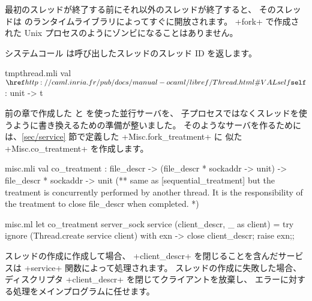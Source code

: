 最初のスレッドが終了する前にそれ以外のスレッドが終了すると、
そのスレッドは \ocaml のランタイムライブラリによってすぐに開放されます。
\ml+fork+ で作成された Unix プロセスのようにゾンビになることはありません。

システムコール  は呼び出したスレッドのスレッド ID を返します。
\begin{listingcodefile}{tmpthread.mli}
val $\libvalue{Thread}{self}$ : unit -> t
\end{listingcodefile}

前の章で作成した  と  を使った並行サーバを、
子プロセスではなくスレッドを使うように書き換えるための準備が整いました。
そのようなサーバを作るためには、\ref{sec/service} 節で定義した \ml+Misc.fork_treatment+ に
似た \ml+Misc.co_treatment+ を作成します。

%
\begin{codefile}{misc.mli}
val co_treatment :
file_descr -> (file_descr * sockaddr -> unit) ->
file_descr * sockaddr -> unit
(** same as [sequential_treatment] but the treatment is concurrently
 performed by another thread. It is the responsibility of the treatment
 to close file_descr when completed. *)
\end{codefile}
%
\begin{listingcodefile}{misc.ml}
let co_treatment server_sock service (client_descr, _ as client) =
  try ignore (Thread.create service client)
  with exn -> close client_descr; raise exn;;
\end{listingcodefile}
%
スレッドの作成に作成して場合、
\ml+client_descr+ を閉じることを含んだサービスは \ml+service+ 関数によって処理されます。
スレッドの作成に失敗した場合、
ディスクリプタ \ml+client_descr+ を閉じてクライアントを放棄し、
エラーに対する処理をメインプログラムに任せます。

